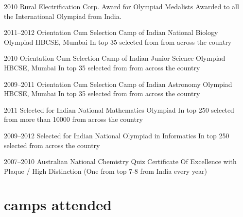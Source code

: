 \documentclass[11pt]{friggeri-cv}
\begin{document}
\begin{entrylist}
  \entryy
    {2010}
    {Rural Electrification Corp. Award for Olympiad Medalists}
    {}
    {Awarded to all the International Olympiad from India.}
\end{entrylist}


\begin{entrylist}
  \entryy
    {2011--2012}
    {Orientation Cum Selection Camp of Indian National Biology Olympiad}
    {HBCSE, Mumbai}
    {In top 35 selected from  from across the country}

\end{entrylist}


\begin{entrylist}
  \entryy
    {2010}
    {Orientation Cum Selection Camp of Indian Junior Science Olympiad}
    {HBCSE, Mumbai}
    {In top 35  selected from  from across the country}

\end{entrylist}

\begin{entrylist}
  \entryy
    {2009--2011}
    {Orientation Cum Selection Camp of Indian Astronomy Olympiad}
    {HBCSE, Mumbai}
    {In top 35 selected from  from across the country}

\end{entrylist}

\begin{entrylist}
  \entryy
    {2011}
    {Selected for Indian National Mathematics Olympiad}{}
    {In top 250 selected from more than 10000 from across the country}

\end{entrylist}

\begin{entrylist}
  \entryy
    {2009--2012}
    {Selected for Indian National Olympiad in Informatics}
    {}
    {In top 250  selected from across the country}
\end{entrylist}


\begin{entrylist}
  \entryy
    {2007--2010}
    {Australian National Chemistry Quiz}
    {}
    {Certificate Of Excellence with Plaque / High Distinction (One from top 7-8 from India every year)}
\end{entrylist}




\section{camps attended}
\end{document}
